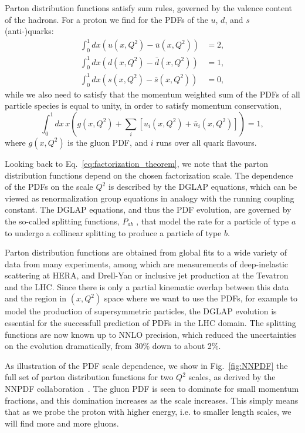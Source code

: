Parton distribution functions satisfy sum rules, governed by the valence content of the
hadrons. For a proton we find for the PDFs of the $u$, $d$,
and $s$ (anti-)quarks: 
\begin{align}
  \int_0^1 dx \left( u(x,Q^2) - \bar{u}(x,Q^2)\right) &= 2, \\[-2pt]
  \int_0^1 dx \left( d(x,Q^2) - \bar{d}(x,Q^2)\right) &= 1, \\[-2pt]
  \int_0^1 dx \left( s(x,Q^2) - \bar{s}(x,Q^2)\right) &= 0, 
\end{align}
while we also need to satisfy that the momentum weighted sum of the PDFs of all particle species is
equal to unity, in order to satisfy momentum conservation, 
\begin{equation}
  \int_0^1 dx \, x \left( g(x,Q^2) + \sum_i [u_i(x,Q^2) + \bar{u}_i(x,Q^2)]\right) = 1 ,
\end{equation}
where $g(x,Q^2)$ is the gluon PDF, and $i$ runs over all quark flavours. 

Looking back to Eq.~\ref{eq:factorization_theorem}, we note that the parton distribution
functions depend on the chosen factorization scale. The dependence of the PDFs on the scale $Q^2$
is described by the DGLAP equations, which can be viewed as renormalization group equations in
analogy with the running coupling constant. 
The DGLAP equations, and thus the PDF evolution, are governed by the so-called splitting functions,
$P_{ab}$ , that model the rate for a particle of type $a$ to undergo a collinear splitting to
produce a particle of type $b$. 

Parton distribution functions are obtained from global fits to a wide variety of data from
many experiments, among which are measurements of deep-inelastic scattering at HERA, and Drell-Yan
or inclusive jet production at the Tevatron and the LHC. 
Since there is only a partial kinematic overlap between this data and the region in $(x,Q^2)$ space
where we want to use the PDFs, for example to model the production of supersymmetric particles,
the DGLAP evolution is essential for the successfull prediction of PDFs in the LHC domain. 
The splitting functions are now known up to NNLO precision, which reduced the uncertainties on the
evolution dramatically, from 30\% down to about 2\%.

As illustration of the PDF scale dependence, we show in Fig.~\ref{fig:NNPDF} the full
set of parton distribution functions for two $Q^2$ scales, as derived by the \textsc{NNPDF}
collaboration~\cite{Ball:2012cx}. 
The gluon PDF is seen to dominate for small momentum fractions, and this domination increases as the
scale increases. This simply means that as we probe the proton with higher energy, i.e. to smaller
length scales, we will find more and more gluons. 

